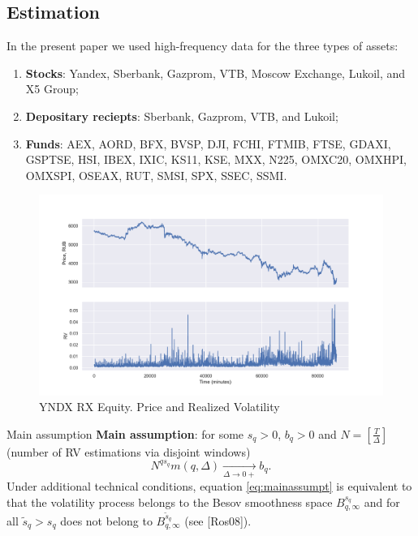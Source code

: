         \subsection{Estimation}
            \begin{frame}{}
                In the present paper we used high-frequency data for the three types of assets:
                \begin{enumerate}
                    \item\textbf{Stocks}: Yandex, Sberbank, Gazprom, VTB, Moscow Exchange, Lukoil, and X5 Group;
                    \item\textbf{Depositary reciepts}: Sberbank, Gazprom, VTB, and Lukoil;
                    \item\textbf{Funds}: AEX, AORD, BFX, BVSP, DJI, FCHI, FTMIB, FTSE, GDAXI, GSPTSE, HSI, IBEX, IXIC, KS11, KSE, MXX, N225, OMXC20, OMXHPI, OMXSPI, OSEAX, RUT, SMSI, SPX, SSEC, SSMI.
                \end{enumerate}
            \end{frame}

            \begin{frame}
                \begin{figure}[htbp]
                    \includegraphics[width=0.75\linewidth]{fig/YNDX RX Equity RVol.pdf}
                    \caption{YNDX RX Equity. Price and Realized Volatility}
                    \label{fig:priceRV} 
                \end{figure}
            \end{frame}

            \begin{frame}{Main assumption}
                \textbf{Main assumption}: for some $s_q > 0 $, $b_q > 0$ and $N = \left[\frac{T}{\Delta}\right]$ 
                (number of RV estimations via disjoint windows)
                \begin{equation}\label{eq:mainassumpt}
                    N^{qs_q} m(q, \Delta) \xrightarrow[\Delta \to 0+]{} b_q.
                \end{equation}
                Under additional technical conditions, equation \eqref{eq:mainassumpt} is equivalent to that the volatility process 
                belongs to the Besov smoothness space $B^{s_q}_{q, \infty}$ and for all $\tilde{s}_q > s_q$ does not belong to 
                $B^{\tilde{s}_q}_{q, \infty}$ (see [Ros08]).
            \end{frame}



